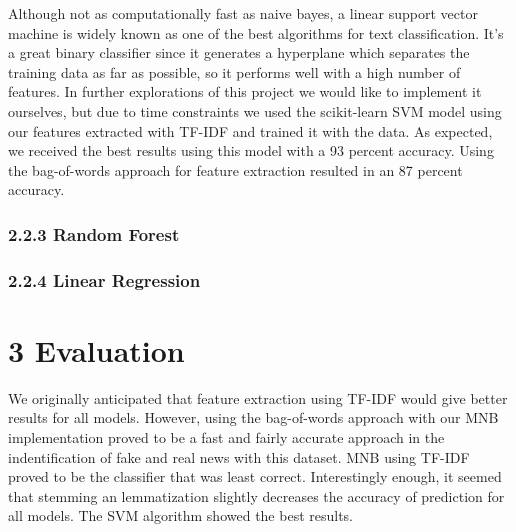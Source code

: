 \documentclass{neu_handout}
\begin{document}
Although not as computationally fast as naive bayes, a linear support vector machine is widely known as one of the best  algorithms for text classification. It's a great binary classifier since it generates a hyperplane which separates the training data as far as possible, so it performs well with a high number of features. In further explorations of this project we would like to implement it ourselves, but due to time constraints we used the scikit-learn SVM model using our features extracted with TF-IDF and trained it with the data. As expected, we received the best results using this model with a 93 percent accuracy. Using the bag-of-words approach for feature extraction resulted in an 87 percent accuracy.



\subsubsection*{2.2.3 Random Forest}
 
 
\subsubsection*{2.2.4 Linear Regression}


\section*{3 Evaluation}

We originally anticipated that feature extraction using TF-IDF would give better results for all models. However, using the bag-of-words approach with our MNB implementation proved to be a fast and fairly accurate approach in the indentification of fake and real news with this dataset. MNB using TF-IDF proved to be the classifier that was least correct. Interestingly enough, it seemed that stemming an lemmatization slightly decreases the accuracy of prediction for all models. The SVM algorithm showed the best results.
\end{document}
